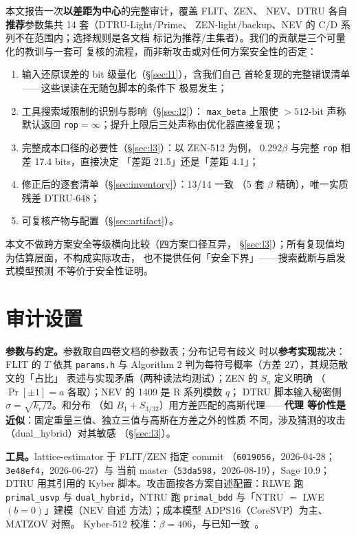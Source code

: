 \documentclass[11pt,a4paper,zihao=-4]{ctexart}
\newcommand{\code}[1]{\texttt{#1}}
\begin{document}
本文报告一次\textbf{以差距为中心}的完整审计，覆盖 FLIT、ZEN、
NEV、DTRU 各自\textbf{推荐}参数集共 14 套（DTRU-Light/Prime、
ZEN-light/backup、NEV 的 C/D 系列不在范围内；选择规则是各文档
标记为推荐/主集者）。我们的贡献是三个可量化的教训与一套可
复核的流程，而非新攻击或对任何方案安全性的否定：
\begin{enumerate}[leftmargin=2em,itemsep=0.1em]
\item 输入还原误差的 bit 级量化（\S\ref{sec:l1}），含我们自己
      首轮复现的完整错误清单——这些误读在无随包脚本的条件下
      极易发生；
\item 工具搜索域限制的识别与影响（\S\ref{sec:l2}）：
      \code{max\_beta} 上限使 $>512$-bit 声称默认返回
      \code{rop}$=\infty$；提升上限后三处声称由优化器直接复现；
\item 完整成本口径的必要性（\S\ref{sec:l3}）：以 ZEN-512 为例，
      $0.292\beta$ 与完整 \code{rop} 相差 17.4 bits，直接决定
      「差距 21.5」还是「差距 4.1」；
\item 修正后的逐套清单（\S\ref{sec:inventory}）：13/14 一致
      （5 套 $\beta$ 精确），唯一实质残差 DTRU-648；
\item 可复核产物与配置（\S\ref{sec:artifact}）。
\end{enumerate}

本文不做跨方案安全等级横向比较（四方案口径互异，
\S\ref{sec:l3}）；所有复现值均为估算层面，不构成实际攻击，
也不提供任何「安全下界」——搜索截断与启发式模型预测
不等价于安全性证明。

\section{审计设置}

\textbf{参数与约定。}参数取自四卷文档的参数表；分布记号有歧义
时以\textbf{参考实现}裁决：FLIT 的 $T$ 依其 \code{params.h} 与
Algorithm 2 判为每符号概率（方差 $2T$），其规范散文的「占比」
表述与实现矛盾（两种读法均测试）；ZEN 的 $S_a$ 定义明确
（$\Pr[\pm1]{=}a$ 各取）；NEV 的 1409 是 R 系列模数 $q$；
DTRU 脚本输入秘密侧 $\sigma{=}\sqrt{k_r/2}$。和分布
（如 $B_1{+}S_{3/32}$）用方差匹配的高斯代理——\textbf{代理
等价性是近似}：固定重量三值、独立三值与高斯在方差之外的性质
不同，涉及猜测的攻击（dual\_hybrid）对其敏感
（\S\ref{sec:l3}）。

\textbf{工具。}lattice-estimator 于 FLIT/ZEN 指定 commit
（\code{6019056}，2026-04-28；\code{3e48ef4}，2026-06-27）与
当前 master（\code{53da598}，2026-08-19），Sage 10.9；
DTRU 用其引用的 Kyber 脚本。攻击面按各方案自述配置：RLWE 跑
\code{primal\_usvp} 与 \code{dual\_hybrid}，NTRU 跑
\code{primal\_bdd} 与「NTRU $=$ LWE$(b{=}0)$」建模（NEV 自述
方法）；成本模型 ADPS16（CoreSVP）为主、MATZOV 对照。
Kyber-512 校准：$\beta{=}406$，与已知一致~\cite{newhope,kyber}。
\end{document}

